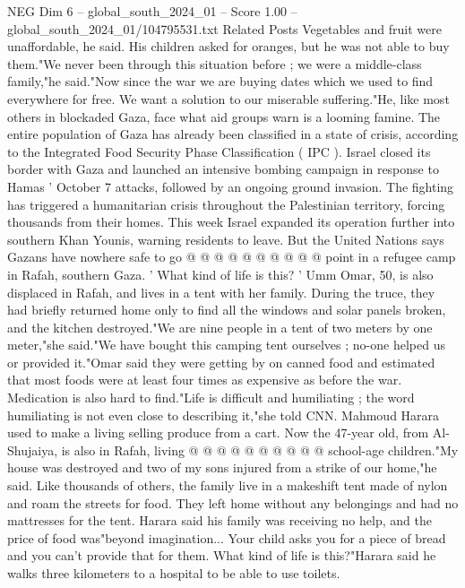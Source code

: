 \begin{textsample}{NEG Dim 6 – global\_south\_2024\_01 – Score 1.00 – global\_south\_2024\_01/104795531.txt}  \label{ex:f6_neg_375}
Related Posts Vegetables and fruit were unaffordable, he said.
His children asked for oranges, but he was not able to buy them."We never been through this situation before ; we were a middle-class family,"he said."Now since the war we are buying dates which we used to find everywhere for free.
We want a solution to our miserable suffering."He, like most others in blockaded Gaza, face what aid groups warn is a looming famine.
The entire population of Gaza has already been classified in a state of crisis, according to the Integrated Food Security Phase Classification ( IPC ).
Israel closed its border with Gaza and launched an intensive bombing campaign in response to Hamas ' October 7 attacks, followed by an ongoing ground invasion.
The fighting has triggered a humanitarian crisis throughout the Palestinian territory, forcing thousands from their homes.
This week Israel expanded its operation further into southern Khan Younis, warning residents to leave.
But the United Nations says Gazans have nowhere safe to go @ @ @ @ @ @ @ @ @ @ point in a refugee camp in Rafah, southern Gaza. ' What kind of life is this? ' Umm Omar, 50, is also displaced in Rafah, and lives in a tent with her family.
During the truce, they had briefly returned home only to find all the windows and solar panels broken, and the kitchen destroyed."We are nine people in a tent of two meters by one meter,"she said."We have bought this camping tent ourselves ; no-one helped us or provided it."Omar said they were getting by on canned food and estimated that most foods were at least four times as expensive as before the war.
Medication is also hard to find."Life is difficult and humiliating ; the word humiliating is not even close to describing it,"she told CNN.
Mahmoud Harara used to make a living selling produce from a cart.
Now the 47-year old, from Al-Shujaiya, is also in Rafah, living @ @ @ @ @ @ @ @ @ @ school-age children."My house was destroyed and two of my sons injured from a strike of our home,"he said.
Like thousands of others, the family live in a makeshift tent made of nylon and roam the streets for food.
They left home without any belongings and had no mattresses for the tent.
Harara said his family was receiving no help, and the price of food was"beyond imagination...
Your child asks you for a piece of bread and you can't provide that for them.
What kind of life is this?"Harara said he walks three kilometers to a hospital to be able to use toilets.

\end{textsample}
